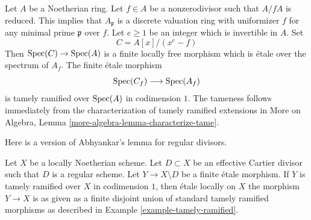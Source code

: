 \begin{example}
\label{example-tamely-ramified}
Let $A$ be a Noetherian ring. Let $f \in A$ be a nonzerodivisor
such that $A/fA$ is reduced. This implies that $A_\mathfrak p$
is a discrete valuation ring with uniformizer $f$ for any
minimal prime $\mathfrak p$ over $f$. Let $e \geq 1$ be an integer which
is invertible in $A$. Set
$$
C = A[x]/(x^e - f)
$$
Then $\mathop{\mathrm{Spec}}(C) \to \mathop{\mathrm{Spec}}(A)$ is a finite locally free morphism
which is \'etale over the spectrum of $A_f$. The finite \'etale morphism
$$
\mathop{\mathrm{Spec}}(C_f) \longrightarrow \mathop{\mathrm{Spec}}(A_f)
$$
is tamely ramified over $\mathop{\mathrm{Spec}}(A)$ in codimension $1$. The
tameness follows immediately from the characterization of tamely ramified
extensions in
More on Algebra, Lemma \ref{more-algebra-lemma-characterize-tame}.
\end{example}

\noindent
Here is a version of Abhyankar's lemma for regular divisors.

\begin{lemma}
\label{lemma-abhyankar-one-divisor}
Let $X$ be a locally Noetherian scheme. Let $D \subset X$
be an effective Cartier divisor such that $D$ is a regular scheme.
Let $Y \to X \setminus D$ be a finite \'etale morphism.
If $Y$ is tamely ramified over $X$ in codimension $1$, then
\'etale locally on $X$ the morphism $Y \to X$ is as given
as a finite disjoint union of standard tamely ramified
morphisms as described in Example \ref{example-tamely-ramified}.
\end{lemma}

